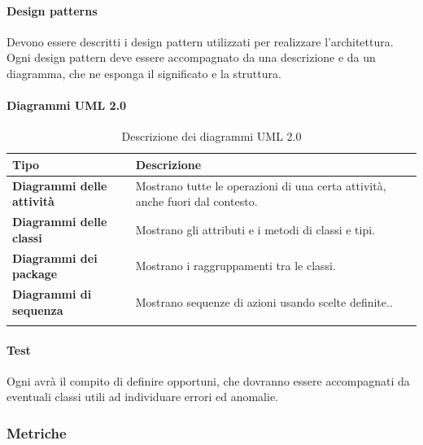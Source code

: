 \paragraph*{Design patterns}
Devono essere descritti i design pattern utilizzati per realizzare l'architettura. Ogni design pattern deve essere accompagnato da una descrizione e da un diagramma, che ne esponga il significato e la struttura.
\newpage
\paragraph*{Diagrammi UML 2.0}

{
\setlength{\freewidth}{\dimexpr\textwidth-0\tabcolsep}
	\renewcommand{\arraystretch}{1.5}
	\setlength{\aboverulesep}{0pt}
	\setlength{\belowrulesep}{0pt}
	\begin{longtable}{L{.210\freewidth} L{.6\freewidth} L{.080\freewidth}}
		\textbf{Tipo} & \textbf{Descrizione} \\
		\toprule
		\endhead		
		\textbf{Diagrammi delle attività} & Mostrano tutte le operazioni di una certa attività, anche fuori dal contesto. \\
		\textbf{Diagrammi delle classi} & Mostrano gli attributi e i metodi di classi e tipi.\\
		\textbf{Diagrammi dei package} & Mostrano i raggruppamenti tra le classi. \\
		\textbf{Diagrammi di sequenza} & Mostrano sequenze di azioni usando scelte definite.. \\
		\bottomrule
		\hiderowcolors
		\caption{Descrizione dei diagrammi UML 2.0}
	\end{longtable}
}
\paragraph*{Test}
Ogni \prog{} avrà il compito di definire  opportuni, che dovranno essere accompagnati da eventuali classi utili ad individuare errori ed anomalie.

\subsubsection*{Metriche}

